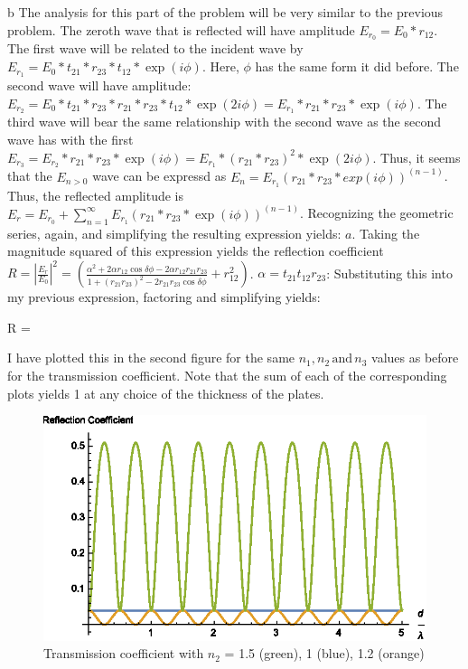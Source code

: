 \begin{homeworkProblem}
\begin{homeworkSection}{b}
The analysis for this part of the problem will be very similar to the previous problem. The zeroth wave that is reflected will have amplitude $E_{r_0} = E_0*r_{12}$. The first wave will be related to the incident wave by $E_{r_1} = E_0*t_{21}*r_{23}*t_{12}*\exp(i\phi)$. Here, $\phi$ has the same form it did before. The second wave will have amplitude: $E_{r_2} = E_0*t_{21}*r_{23}*r_{21}*r_{23}*t_{12}*\exp(2 i\phi) = E_{r_1} * r_{21}*r_{23}*\exp(i\phi)$. The third wave will bear the same relationship with the second wave as the second wave has with the first $E_{r_3} = E_{r_2} *r_{21} * r_{23}*\exp(i\phi) = E_{r_1} * (r_{21}*r_{23})^2*\exp(2i\phi)$. Thus, it seems that the $E_{n>0}$ wave can be expressd as $E_{n} = E_{r_1}(r_{21}*r_{23}*exp(i\phi))^(n-1)$.
\\
Thus, the reflected amplitude is $E_{r} = E_{r_0} + \sum\limits_{n=1}^\infty E_{r_1}(r_{21}*r_{23}*\exp(i\phi))^(n-1)$. Recognizing the geometric series, again, and simplifying the resulting expression yields: $a$. Taking the magnitude squared of this expression yields the reflection coefficient $R = |\frac{E_r}{E_0}|^2 = (\frac{\alpha^2 + 2 \alpha r_{12}\cos\delta\phi - 2\alpha r_{12}r_{21}r_{23}}{1+(r_{21}r_{23})^2-2 r_{21} r_{23} \cos\delta\phi} + r_{12}^2)$. $\alpha = t_{21}t_{12}r_{23}$: Substituting this into my previous expression, factoring and simplifying yields:
\begin{problemAnswer}{
R = 
}
\end{problemAnswer}

I have plotted this in the second figure for the same $n_1, n_2 \,\text{and}\, n_3$ values as before for the transmission coefficient. Note that the sum of each of the corresponding plots yields 1 at any choice of the thickness of the plates.

\begin{figure}
  \centering\includegraphics[width=.5\textwidth]{Images/RefCoef.eps}
  \caption{Transmission coefficient with $n_2$ = 1.5 (green), 1 (blue), 1.2 (orange)}
\end{figure}


\end{homeworkSection}
\end{homeworkProblem}
